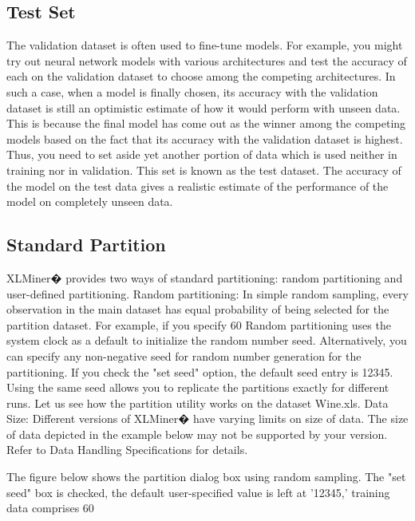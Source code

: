 \subsection*{Test Set}
The validation dataset is often used to fine-tune models. For example, you might try out neural network models with various architectures and test the accuracy of each on the validation dataset to choose among the competing architectures. In such a case, when a model is finally chosen, its accuracy with the validation dataset is still an optimistic estimate of how it would perform with unseen data. This is because the final model has come out as the winner among the competing models based on the fact that its accuracy with the validation dataset is highest. Thus, you need to set aside yet another portion of data which is used neither in training nor in validation. This set is known as the test dataset. The accuracy of the model on the test data gives a realistic estimate of the performance of the model on completely unseen data.


\subsection{Standard Partition}
XLMiner� provides two ways of standard partitioning: random partitioning and user-defined partitioning.
Random partitioning: In simple random sampling, every observation in the main dataset has equal probability of being selected for the partition dataset. For example, if you specify 60%
Random partitioning uses the system clock as a default to initialize the random number seed. Alternatively, you can specify any non-negative seed for random number generation for the partitioning. If you check the "set seed" option, the default seed entry is 12345. 
Using the same seed allows you to replicate the partitions exactly for different runs. 
Let us see how the partition utility works on the dataset Wine.xls.
Data Size: Different versions of XLMiner�  have varying limits on size of data. The size of data depicted in the example below may not be supported by your version. Refer to Data Handling Specifications for details.

The figure below shows the partition dialog box using random sampling. The "set seed" box is checked, the default user-specified value is left at '12345,' training data comprises 60%

